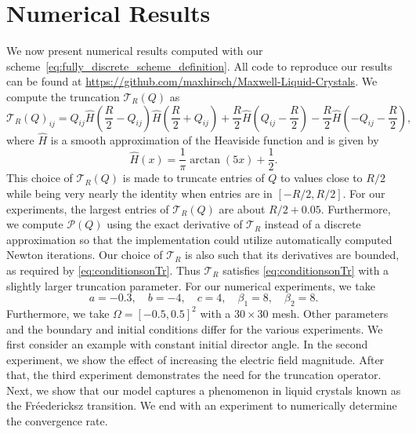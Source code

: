 \documentclass[10pt,letterpaper]{amsart}
\newcommand{\T}{\mathcal T}
\renewcommand{\P}{\mathcal P}
\theoremstyle{definition}{\newtheorem{definition}[lemma]{Definition}}
\theoremstyle{note}{\newtheorem{claim}{Claim}[section]
\newtheorem*{claim*}{Claim}}
\numberwithin{equation}{section}
\begin{document}
\section{Numerical Results}\label{sec:num}
We now present numerical results computed with our scheme~\eqref{eq:fully_discrete_scheme_definition}. All code to reproduce our results can be found at \url{https://github.com/maxhirsch/Maxwell-Liquid-Crystals}. We compute the truncation $\T_R(Q)$ as
\begin{equation}\label{eq:TRnumerics}
    \T_R(Q)_{ij} = Q_{ij} \widehat{H}\left(\frac{R}{2}-Q_{ij}\right) \widehat{H}\left(\frac{R}{2}+Q_{ij}\right) + \frac{R}{2}\widehat{H}\left(Q_{ij} - \frac{R}{2}\right) - \frac{R}{2}\widehat{H}\left(-Q_{ij}-\frac{R}{2}\right),
\end{equation}
where $\widehat{H}$ is a smooth approximation of the Heaviside function and is given by
\begin{equation}\label{eq:TRnumerics2}
 \widehat{H}(x) = \frac{1}{\pi}\arctan(5x) + \frac12.
\end{equation}
This choice of $\T_R(Q)$ is made to truncate entries of $Q$ to values close to $R/2$ while being very nearly the identity when entries are in $[-R/2, R/2]$. For our experiments, the largest entries of $\T_R(Q)$ are about $R/2+0.05$. Furthermore, we compute $\P(Q)$ using the exact derivative of $\T_R$ instead of a discrete approximation so that the implementation could utilize automatically computed Newton iterations. Our choice of $\T_R$ is also such that its derivatives are bounded, as required by \eqref{eq:conditionsonTr}. Thus $\T_R$ satisfies \eqref{eq:conditionsonTr} with a slightly larger truncation parameter.
For our numerical experiments, we take
\[
    a = -0.3,\quad b = -4,\quad c = 4,\quad \beta_1 = 8,\quad \beta_2 = 8.
\]
Furthermore, we take $\Omega = [-0.5,0.5]^2$ with a $30\times 30$ mesh. Other parameters and the boundary and initial conditions differ for the various experiments. We first consider an example with constant initial director angle. In the second experiment, we show the effect of increasing the electric field magnitude. After that, the third experiment demonstrates the need for the truncation operator. Next, we show that our model captures a phenomenon in liquid crystals known as the Fr\'{e}edericksz transition. We end with an experiment to numerically determine the convergence rate.
\end{document}
